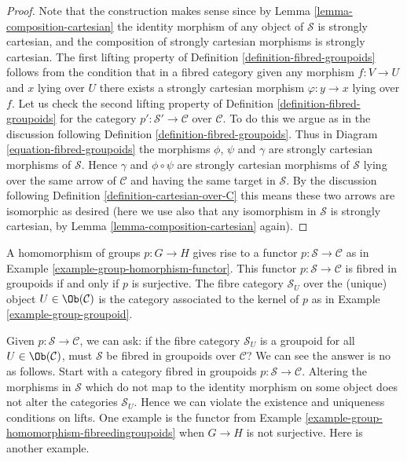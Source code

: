 \begin{proof}
Note that the construction makes sense since by
Lemma \ref{lemma-composition-cartesian}
the identity morphism of any object of $\mathcal{S}$ is strongly cartesian,
and the composition of strongly cartesian morphisms is strongly cartesian.
The first lifting property of
Definition \ref{definition-fibred-groupoids}
follows from the condition that in a fibred category
given any morphism $f : V \to U$ and $x$ lying over $U$ there exists
a strongly cartesian morphism $\varphi : y \to x$ lying over $f$.
Let us check the second lifting property of
Definition \ref{definition-fibred-groupoids}
for the category $p' : \mathcal{S}' \to \mathcal{C}$ over $\mathcal{C}$.
To do this we argue as in the discussion following
Definition \ref{definition-fibred-groupoids}.
Thus in Diagram \ref{equation-fibred-groupoids} the
morphisms $\phi$, $\psi$ and $\gamma$ are strongly cartesian morphisms
of $\mathcal{S}$.
Hence $\gamma$ and $\phi \circ \psi$ are strongly cartesian morphisms
of $\mathcal{S}$ lying over the same arrow of $\mathcal{C}$ and
having the same target in $\mathcal{S}$. By the discussion following
Definition \ref{definition-cartesian-over-C}
this means these two arrows are isomorphic as desired (here we use also
that any isomorphism in $\mathcal{S}$ is strongly cartesian, by
Lemma \ref{lemma-composition-cartesian} again).
\end{proof}

\begin{example}
\label{example-group-homomorphism-fibreedingroupoids}
A homomorphism of groups $p : G \to H$ gives rise to a functor
$p : \mathcal{S}\to\mathcal{C}$ as in Example
\ref{example-group-homorphism-functor}. This functor
$p : \mathcal{S}\to\mathcal{C}$ is fibred in groupoids if and only if
$p$ is surjective.  The fibre category $\mathcal{S}_U$ over the (unique)
object $U\in \Ob(\mathcal{C})$ is the category associated to the
kernel of $p$ as in Example \ref{example-group-groupoid}.
\end{example}

\noindent
Given $p : \mathcal{S} \to \mathcal{C}$, we can ask: if the fibre
category $\mathcal{S}_U$ is a groupoid for all $U \in \Ob(\mathcal{C})$,
must $\mathcal{S}$ be fibred in groupoids over $\mathcal{C}$? We can see the
answer is no as follows. Start with a category fibred in groupoids
$p : \mathcal{S} \to \mathcal{C}$. Altering the morphisms in $\mathcal{S}$
which do not map to the identity morphism on some object does not alter the
categories $\mathcal{S}_U$. Hence we can violate the existence and uniqueness
conditions on lifts. One example is the functor from Example
\ref{example-group-homomorphism-fibreedingroupoids} when $G \to H$ is not
surjective. Here is another example.

